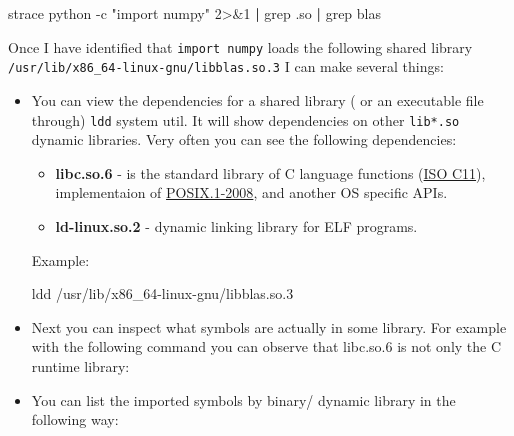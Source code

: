\documentclass[
]{article}
\newenvironment{Shaded}{}{}
\newcommand{\AttributeTok}[1]{\textcolor[rgb]{0.49,0.56,0.16}{#1}}
\newcommand{\DecValTok}[1]{\textcolor[rgb]{0.25,0.63,0.44}{#1}}
\newcommand{\ExtensionTok}[1]{#1}
\newcommand{\FunctionTok}[1]{\textcolor[rgb]{0.02,0.16,0.49}{#1}}
\newcommand{\KeywordTok}[1]{\textcolor[rgb]{0.00,0.44,0.13}{\textbf{#1}}}
\newcommand{\NormalTok}[1]{#1}
\newcommand{\OperatorTok}[1]{\textcolor[rgb]{0.40,0.40,0.40}{#1}}
\newcommand{\StringTok}[1]{\textcolor[rgb]{0.25,0.44,0.63}{#1}}
\begin{document}
\begin{Shaded}
\begin{Highlighting}[]
\ExtensionTok{strace}\NormalTok{ python }\AttributeTok{{-}c} \StringTok{"import numpy"} \DecValTok{2}\OperatorTok{\textgreater{}\&}\DecValTok{1} \KeywordTok{|} \FunctionTok{grep}\NormalTok{ .so }\KeywordTok{|} \FunctionTok{grep}\NormalTok{ blas}
\end{Highlighting}
\end{Shaded}

Once I have identified that \texttt{import\ numpy} loads the following
shared library \texttt{/usr/lib/x86\_64-linux-gnu/libblas.so.3} I can
make several things:

\begin{itemize}
\item
  You can view the dependencies for a shared library ( or an executable
  file through) \texttt{ldd} system util. It will show dependencies on
  other \texttt{lib*.so} dynamic libraries. Very often you can see the
  following dependencies:

  \begin{itemize}
  \item
    \textbf{libc.so.6} - is the standard library of C language functions
    (\href{https://www.iso.org/standard/57853.html}{ISO C11}),
    implementaion of
    \href{https://pubs.opengroup.org/onlinepubs/9699919799.2008edition/functions/contents.html}{POSIX.1-2008},
    and another OS specific APIs.
  \item
    \textbf{ld-linux.so.2} - dynamic linking library for ELF programs.
  \end{itemize}

  Example:

\begin{Shaded}
\begin{Highlighting}[]
\FunctionTok{ldd}\NormalTok{ /usr/lib/x86\_64{-}linux{-}gnu/libblas.so.3}
\end{Highlighting}
\end{Shaded}
\item
  Next you can inspect what symbols are actually in some library. For
  example with the following command you can observe that libc.so.6 is
  not only the C runtime library:

\begin{Shaded}
\end{Shaded}
\item
  You can list the imported symbols by binary/ dynamic library in the
  following way:


\end{itemize}
\end{document}
